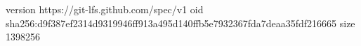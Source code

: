 version https://git-lfs.github.com/spec/v1
oid sha256:d9f387ef2314d9319946ff913a495d140ffb5e7932367fda7deaa35fdf216665
size 1398256

